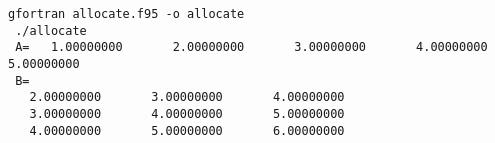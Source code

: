 \begin{Verbatim}[frame=lines,label=allocate - commands and output]
 gfortran allocate.f95 -o allocate
 ./allocate
 A=   1.00000000       2.00000000       3.00000000       4.00000000       5.00000000    
 B=
   2.00000000       3.00000000       4.00000000    
   3.00000000       4.00000000       5.00000000    
   4.00000000       5.00000000       6.00000000    
\end{Verbatim}
